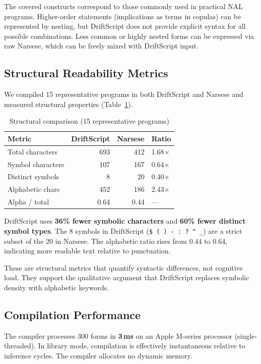 \documentclass[11pt,a4paper]{article}
\begin{document}
The covered constructs correspond to those commonly used in practical NAL
programs. Higher-order statements (implications as terms in copulas) can be
represented by nesting, but DriftScript does not provide explicit syntax for
all possible combinations. Less common or highly nested forms can be expressed
via raw Narsese, which can be freely mixed with DriftScript input.

\subsection{Structural Readability Metrics}

We compiled 15 representative programs in both DriftScript and Narsese and
measured structural properties (Table~\ref{tab:readability}).

\begin{table}[h]
\centering
\caption{Structural comparison (15 representative programs)}
\label{tab:readability}
\begin{tabular}{lrrl}
\toprule
\textbf{Metric} & \textbf{DriftScript} & \textbf{Narsese} & \textbf{Ratio} \\
\midrule
Total characters & 693 & 412 & 1.68$\times$ \\
Symbol characters & 107 & 167 & 0.64$\times$ \\
Distinct symbols & 8 & 20 & 0.40$\times$ \\
Alphabetic chars & 452 & 186 & 2.43$\times$ \\
Alpha / total & 0.64 & 0.44 & --- \\
\bottomrule
\end{tabular}
\end{table}

DriftScript uses \textbf{36\% fewer symbolic characters} and \textbf{60\%
fewer distinct symbol types}. The 8 symbols in DriftScript (\texttt{\$ ( ) -
: ? \^{} \_}) are a strict subset of the 20 in Narsese. The alphabetic ratio
rises from 0.44 to 0.64, indicating more readable text relative to
punctuation.

These are structural metrics that quantify syntactic differences, not
cognitive load. They support the qualitative argument that DriftScript
replaces symbolic density with alphabetic keywords.

\subsection{Compilation Performance}

The compiler processes 300 forms in \textbf{3\,ms} on an Apple M-series
processor (single-threaded). In library mode, compilation is effectively instantaneous relative
to inference cycles. The compiler allocates no dynamic memory.
\end{document}
